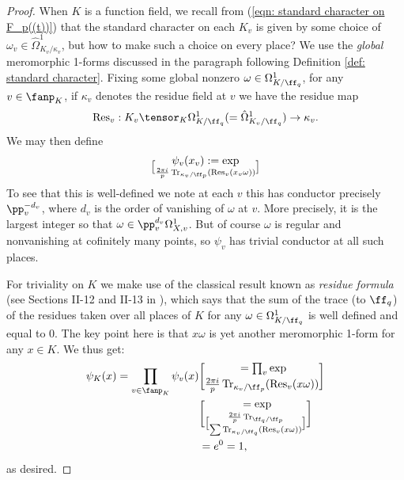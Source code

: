 \documentclass[11pt, x11names, openany]{book}
\begin{document}
\begin{proof}
When $K$ is a function field, we recall from (\ref{eqn: standard character on F_p((t))}) that the standard character on each $K_v$ is given by some choice of $\omega_v \in \hat{\Omega}^1_{K_v/\kappa_v}$, but how to make such a choice on every place? We use the \textit{global} meromorphic 1-forms discussed in the paragraph following Definition \ref{def: standard character}.
Fixing some global nonzero $\omega \in \Omega^1_{K/\ff_q}$, for any $v \in \fanp_K$, if $\kappa_v$ denotes the residue field at $v$ we have the residue map
\begin{equation*}
    \res_v : K_v \tensor_K \Omega^1_{K/\ff_q} (= \hat{\Omega}^1_{K_v/\ff_q} )  \to \kappa_v.
\end{equation*}
We may then define
\begin{equation*}
    \psi_v(x_v) := \exp \brack{\frac{2 \pi i}{p} \tr_{\kappa_v/\ff_p} (\res_v(x_v \omega)) }
\end{equation*}
To see that this is well-defined we note at each $v$ this has conductor precisely $\pp_v^{-d_v}$, where $d_v$ is the order of vanishing of $\omega$ at $v$. More precisely, it is the largest integer so that $\omega \in \pp_v^{d_v} \Omega^1_{X, v}$. But of course $\omega$ is regular and nonvanishing at cofinitely many points, so $\psi_v$ has trivial conductor at all such places.

For triviality on $K$ we make use of the classical result known as \textit{residue formula} (see Sections II-12 and II-13 in \cite{serre2012algebraic}), which says that the sum of the trace (to $\ff_q$) of the residues taken over all places of $K$ for any $\omega \in \Omega^1_{K/\ff_q}$ is well defined and equal to 0. The key point here is that $x \omega$ is yet another meromorphic 1-form for any $x \in K$. We thus get:
\begin{align*}
    \psi_K(x) = \prod_{v \in \fanp_K} \psi_v(x) &= \prod_v \exp \brack{\frac{2 \pi i}{p} \tr_{\kappa_v/\ff_p} (\res_v(x \omega)) }\\ 
    &= \exp \brack{\frac{2 \pi i}{p} \tr_{\ff_q/\ff_p} \brack{\sum  \tr_{\kappa_v/\ff_q} (\res_v(x \omega))} }\\
    &= e^0 = 1,
\end{align*}
as desired.
\end{proof}
\end{document}
